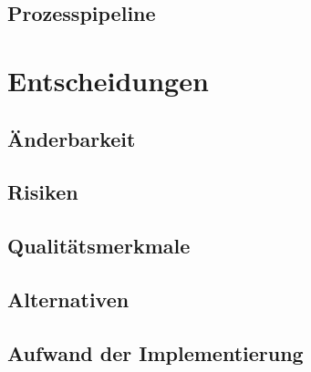 \subsection*{Prozesspipeline}



\section{Entscheidungen}

\subsection*{Änderbarkeit}
\subsection*{Risiken}
\subsection*{Qualitätsmerkmale}
\subsection*{Alternativen}
\subsection*{Aufwand der Implementierung}